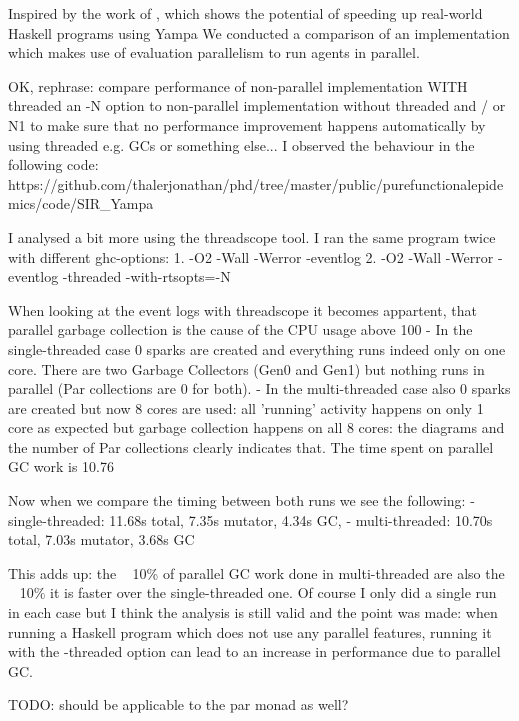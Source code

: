 Inspired by the work of \cite{perez_60_2014}, which shows the potential of speeding up real-world Haskell programs using Yampa We conducted a comparison of an implementation which makes use of evaluation parallelism to run agents in parallel.

OK, rephrase: compare performance of non-parallel implementation WITH threaded an -N option to non-parallel implementation without threaded and / or N1 to make sure that no performance improvement happens automatically by using threaded e.g. GCs or something else...
I observed the behaviour in the following code: https://github.com/thalerjonathan/phd/tree/master/public/purefunctionalepidemics/code/SIR_Yampa

I analysed a bit more using the threadscope tool. I ran the same program twice with different ghc-options:
1. -O2 -Wall -Werror -eventlog 
2. -O2 -Wall -Werror -eventlog -threaded -with-rtsopts=-N

When looking at the event logs with threadscope it becomes appartent, that parallel garbage collection is the cause of the CPU usage above 100%
-  In the single-threaded case 0 sparks are created and everything runs indeed only on one core. There are two Garbage Collectors (Gen0 and Gen1) but nothing runs in parallel (Par collections are 0 for both).
- In the multi-threaded case also 0 sparks are created but now 8 cores are used: all 'running' activity happens on only 1 core as expected but garbage collection happens on all 8 cores: the diagrams and the number of Par collections clearly indicates that. The time spent on parallel GC work is 10.76%

Now when we compare the timing between both runs we see the following: 
- single-threaded: 11.68s total, 7.35s mutator, 4.34s GC,
- multi-threaded: 10.70s total, 7.03s mutator, 3.68s GC

This adds up: the ~ 10\% of parallel GC work done in multi-threaded are also the ~ 10\% it is faster over the single-threaded one. Of course I only did a single run in each case but I think the analysis is still valid and the point was made: when running a Haskell program which does not use any parallel features, running it with the -threaded option can lead to an increase in performance due to parallel GC.


TODO: should be applicable to the par monad as well? 


